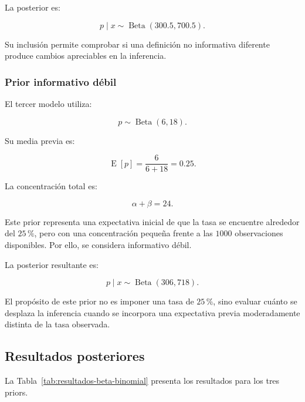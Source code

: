 La posterior es:

\[
p\mid x
\sim
\operatorname{Beta}(300.5,700.5).
\]

Su inclusión permite comprobar si una definición no informativa diferente
produce cambios apreciables en la inferencia.

\subsubsection{Prior informativo débil}

El tercer modelo utiliza:

\[
p
\sim
\operatorname{Beta}(6,18).
\]

Su media previa es:

\[
\operatorname{E}[p]
=
\frac{6}{6+18}
=
0.25.
\]

La concentración total es:

\[
\alpha+\beta
=
24.
\]

Este prior representa una expectativa inicial de que la tasa se encuentre
alrededor del \(25\,\%\), pero con una concentración pequeña frente a las
\(1000\) observaciones disponibles. Por ello, se considera informativo
débil.

La posterior resultante es:

\[
p\mid x
\sim
\operatorname{Beta}(306,718).
\]

El propósito de este prior no es imponer una tasa de \(25\,\%\), sino
evaluar cuánto se desplaza la inferencia cuando se incorpora una
expectativa previa moderadamente distinta de la tasa observada.

\subsection{Resultados posteriores}

La Tabla~\ref{tab:resultados-beta-binomial} presenta los resultados para
los tres priors.

